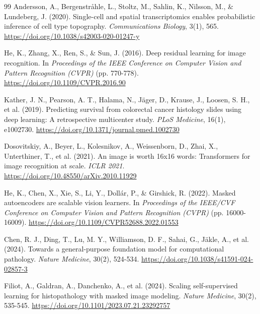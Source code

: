 \documentclass[11pt, a4paper]{article}
\begin{document}
\begin{thebibliography}{99}
 Andersson, A., Bergenstråhle, L., Stoltz, M., Sahlin, K., Nilsson, M., \& Lundeberg, J. (2020). Single-cell and spatial transcriptomics enables probabilistic inference of cell type topography. \textit{Communications Biology}, 3(1), 565. \href{https://doi.org/10.1038/s42003-020-01247-y}{https://doi.org/10.1038/s42003-020-01247-y}

 He, K., Zhang, X., Ren, S., \& Sun, J. (2016). Deep residual learning for image recognition. In \textit{Proceedings of the IEEE Conference on Computer Vision and Pattern Recognition (CVPR)} (pp. 770-778). \href{https://doi.org/10.1109/CVPR.2016.90}{https://doi.org/10.1109/CVPR.2016.90}

 Kather, J. N., Pearson, A. T., Halama, N., Jäger, D., Krause, J., Loosen, S. H., et al. (2019). Predicting survival from colorectal cancer histology slides using deep learning: A retrospective multicenter study. \textit{PLoS Medicine}, 16(1), e1002730. \href{https://doi.org/10.1371/journal.pmed.1002730}{https://doi.org/10.1371/journal.pmed.1002730}

 Dosovitskiy, A., Beyer, L., Kolesnikov, A., Weissenborn, D., Zhai, X., Unterthiner, T., et al. (2021). An image is worth 16x16 words: Transformers for image recognition at scale. \textit{ICLR 2021}. \href{https://doi.org/10.48550/arXiv.2010.11929}{https://doi.org/10.48550/arXiv.2010.11929}

 He, K., Chen, X., Xie, S., Li, Y., Dollár, P., \& Girshick, R. (2022). Masked autoencoders are scalable vision learners. In \textit{Proceedings of the IEEE/CVF Conference on Computer Vision and Pattern Recognition (CVPR)} (pp. 16000-16009). \href{https://doi.org/10.1109/CVPR52688.2022.01553}{https://doi.org/10.1109/CVPR52688.2022.01553}

 Chen, R. J., Ding, T., Lu, M. Y., Williamson, D. F., Sahai, G., Jäkle, A., et al. (2024). Towards a general-purpose foundation model for computational pathology. \textit{Nature Medicine}, 30(2), 524-534. \href{https://doi.org/10.1038/s41591-024-02857-3}{https://doi.org/10.1038/s41591-024-02857-3}

 Filiot, A., Galdran, A., Danchenko, A., et al. (2024). Scaling self-supervised learning for histopathology with masked image modeling. \textit{Nature Medicine}, 30(2), 535-545. \href{https://doi.org/10.1101/2023.07.21.23292757}{https://doi.org/10.1101/2023.07.21.23292757}


\end{thebibliography}
\end{document}
